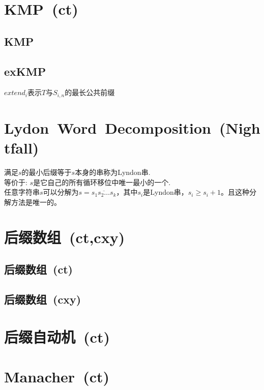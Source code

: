 \section{KMP\ \small(ct)}
    \subsection*{KMP}
    \subsection*{exKMP}
        $ extend_i $表示$ T $与$ S_{i,n} $的最长公共前缀

\section{Lydon\ Word\ Decomposition\ \small(Nightfall)}
    满足$ s $的最小后缀等于$ s $本身的串称为Lyndon串.
    \\等价于: $ s $是它自己的所有循环移位中唯一最小的一个.
    \\任意字符串$ s $可以分解为$ s = \overline{s_1 s_2 \dots s_k} $，其中$ s_i $是Lyndon串，$ s_i \geq s_i + 1 $。且这种分解方法是唯一的。

\section{后缀数组\ \small(ct,cxy)}
    \subsection*{后缀数组\ \small(ct)}
    \subsection*{后缀数组\ \small(cxy)}

\section{后缀自动机\ \small(ct)}

\section{Manacher\ \small(ct)}

